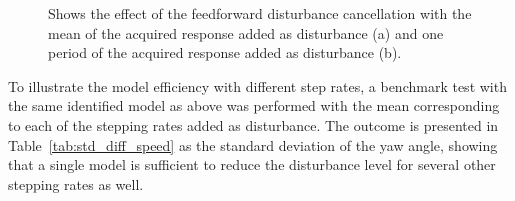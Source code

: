 \begin{figure}[h!]
  \centering %
  \qquad
  \caption{\label{fig:benchmark_dist} Shows the effect of the feedforward disturbance cancellation with the mean of the acquired response added as disturbance (a) and one period of the acquired response added as disturbance (b).}
\end{figure}
\FloatBarrier
To illustrate the model efficiency with different step rates, a benchmark test with the same identified model as above was performed with the mean corresponding to each of the stepping rates added as disturbance. The outcome is presented in Table~\ref{tab:std_diff_speed} as the standard deviation of the yaw angle, showing that a single model is sufficient to reduce the disturbance level for several other stepping rates as well.

